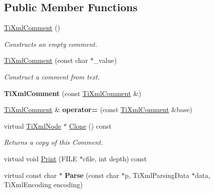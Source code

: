 \subsection*{Public Member Functions}
\begin{DoxyCompactItemize}
\item 
\hypertarget{class_ti_xml_comment_aaa3252031d3e8bd3a2bf51a1c61201b7}{\hyperlink{class_ti_xml_comment_aaa3252031d3e8bd3a2bf51a1c61201b7}{Ti\-Xml\-Comment} ()}\label{class_ti_xml_comment_aaa3252031d3e8bd3a2bf51a1c61201b7}

\begin{DoxyCompactList}\small\item\em Constructs an empty comment. \end{DoxyCompactList}\item 
\hypertarget{class_ti_xml_comment_a37e7802ef17bc03ebe5ae79bf0713d47}{\hyperlink{class_ti_xml_comment_a37e7802ef17bc03ebe5ae79bf0713d47}{Ti\-Xml\-Comment} (const char $\ast$\-\_\-value)}\label{class_ti_xml_comment_a37e7802ef17bc03ebe5ae79bf0713d47}

\begin{DoxyCompactList}\small\item\em Construct a comment from text. \end{DoxyCompactList}\item 
\hypertarget{class_ti_xml_comment_afaec41ac2760ce946ba1590eb5708e50}{{\bfseries Ti\-Xml\-Comment} (const \hyperlink{class_ti_xml_comment}{Ti\-Xml\-Comment} \&)}\label{class_ti_xml_comment_afaec41ac2760ce946ba1590eb5708e50}

\item 
\hypertarget{class_ti_xml_comment_a50888f168745972a1d773a4f5a87beb8}{\hyperlink{class_ti_xml_comment}{Ti\-Xml\-Comment} \& {\bfseries operator=} (const \hyperlink{class_ti_xml_comment}{Ti\-Xml\-Comment} \&base)}\label{class_ti_xml_comment_a50888f168745972a1d773a4f5a87beb8}

\item 
\hypertarget{class_ti_xml_comment_a0d6662bdc52488b9e12b3c7a0453d028}{virtual \hyperlink{class_ti_xml_node}{Ti\-Xml\-Node} $\ast$ \hyperlink{class_ti_xml_comment_a0d6662bdc52488b9e12b3c7a0453d028}{Clone} () const }\label{class_ti_xml_comment_a0d6662bdc52488b9e12b3c7a0453d028}

\begin{DoxyCompactList}\small\item\em Returns a copy of this Comment. \end{DoxyCompactList}\item 
virtual void \hyperlink{class_ti_xml_comment_a6b316527aaa8da0370cd68c22a5a0f5f}{Print} (F\-I\-L\-E $\ast$cfile, int depth) const 
\item 
\hypertarget{class_ti_xml_comment_a11f1ee9d37a49c06f297c827d0f4e790}{virtual const char $\ast$ {\bfseries Parse} (const char $\ast$p, Ti\-Xml\-Parsing\-Data $\ast$data, Ti\-Xml\-Encoding encoding)}\label{class_ti_xml_comment_a11f1ee9d37a49c06f297c827d0f4e790}


\end{DoxyCompactItemize}

